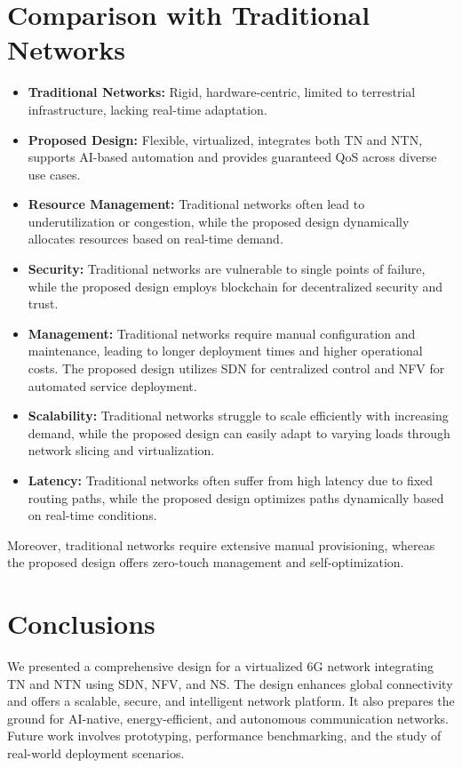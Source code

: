 \documentclass[a4paper,12pt]{article}
\begin{document}
\section{Comparison with Traditional Networks}
\begin{itemize}[noitemsep]
    \item \textbf{Traditional Networks:} Rigid, hardware-centric, limited to terrestrial infrastructure, lacking real-time adaptation.
    \item \textbf{Proposed Design:} Flexible, virtualized, integrates both TN and NTN, supports AI-based automation and provides guaranteed QoS across diverse use cases.
    \item \textbf{Resource Management:} Traditional networks often lead to underutilization or congestion, while the proposed design dynamically allocates resources based on real-time demand.
    \item \textbf{Security:} Traditional networks are vulnerable to single points of failure, while the proposed design employs blockchain for decentralized security and trust.
    \item \textbf{Management:} Traditional networks require manual configuration and maintenance, leading to longer deployment times and higher operational costs. The proposed design utilizes SDN for centralized control and NFV for automated service deployment.
    \item \textbf{Scalability:} Traditional networks struggle to scale efficiently with increasing demand, while the proposed design can easily adapt to varying loads through network slicing and virtualization.
    \item \textbf{Latency:} Traditional networks often suffer from high latency due to fixed routing paths, while the proposed design optimizes paths dynamically based on real-time conditions.
\end{itemize}
Moreover, traditional networks require extensive manual provisioning, whereas the proposed design offers zero-touch management and self-optimization.

\section{Conclusions}
We presented a comprehensive design for a virtualized 6G network integrating TN and NTN using SDN, NFV, and NS. The design enhances global connectivity and offers a scalable, secure, and intelligent network platform. It also prepares the ground for AI-native, energy-efficient, and autonomous communication networks. Future work involves prototyping, performance benchmarking, and the study of real-world deployment scenarios.
\end{document}
